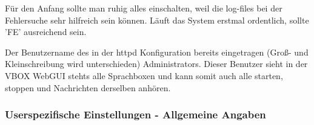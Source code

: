 \begin{description}
    Für den Anfang sollte man ruhig alles einschalten, weil die log-files bei der Fehlersuche 
    sehr hilfreich sein können. Läuft das System erstmal ordentlich, sollte 'FE' ausreichend sein.


    Der Benutzername des in der httpd Konfiguration bereits eingetragen 
    (Groß- und Kleinschreibung wird unterschieden) Administrators. Dieser Benutzer
    sieht in der VBOX WebGUI stehts alle Sprachboxen und kann somit auch alle 
    starten, stoppen und Nachrichten derselben anhören.

\end{description}

\subsubsection{Userspezifische Einstellungen - Allgemeine Angaben}

